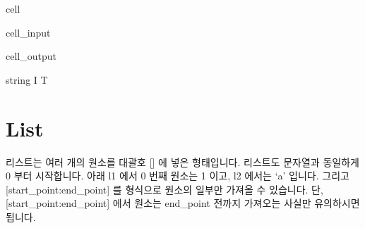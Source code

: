 \documentclass[letterpaper,10pt,english]{jupyterBook}
\begin{document}
\begin{sphinxuseclass}{cell}\begin{sphinxVerbatimInput}

\begin{sphinxuseclass}{cell_input}
\begin{sphinxVerbatim}[commandchars=\\\{\}]
  
  

\PYG{p}{[}\PYG{p}{]} \PYG{p}{[}\PYG{p}{]} 
\end{sphinxVerbatim}

\end{sphinxuseclass}\end{sphinxVerbatimInput}
\begin{sphinxVerbatimOutput}

\begin{sphinxuseclass}{cell_output}
\begin{sphinxVerbatim}[commandchars=\\\{\}]
string
I T
\end{sphinxVerbatim}

\end{sphinxuseclass}\end{sphinxVerbatimOutput}

\end{sphinxuseclass}

\section{List}
\label{\detokenize{chapter2/2.1.1_Python_Basics:list}}
\sphinxAtStartPar
리스트는 여러 개의 원소를 대괄호 {[}{]} 에 넣은 형태입니다. 리스트도 문자열과 동일하게 0 부터 시작합니다.
아래 l1 에서 0 번째 원소는 1 이고, l2 에서는 ‘a’ 입니다. 그리고 {[}start\_point:end\_point{]} 를 형식으로 원소의 일부만 가져올 수 있습니다. 단, {[}start\_point:end\_point{]} 에서 원소는 end\_point 전까지 가져오는 사실만 유의하시면 됩니다.
\end{document}
